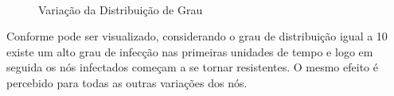 \documentclass[12pt, a4paper]{article}
\begin{document}
\begin{figure*}[ht]
  \centering
  \\
  \caption{Variação da Distribuição de Grau}
  \label{fig:network-virus}
\end{figure*}

Conforme pode ser visualizado, considerando o grau de distribuição igual a 10
existe um alto grau de infecção nas primeiras unidades de tempo e logo em seguida
os nós infectados começam a se tornar resistentes. O mesmo efeito é percebido para
todas as outras variações dos nós.
\end{document}

